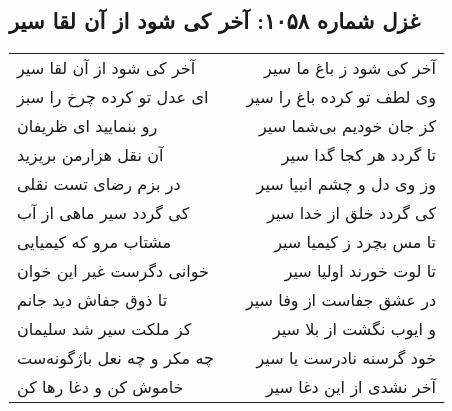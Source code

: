 \begin{center}
\section*{غزل شماره ۱۰۵۸: آخر کی شود از آن لقا سیر}
\label{sec:1058}
\begin{longtable}{l p{0.5cm} r}
آخر کی شود از آن لقا سیر
&&
آخر کی شود ز باغ ما سیر
\\
ای عدل تو کرده چرخ را سبز
&&
وی لطف تو کرده باغ را سیر
\\
رو بنمایید ای ظریفان
&&
کز جان خودیم بی‌شما سیر
\\
آن نقل هزارمن بریزید
&&
تا گردد هر کجا گدا سیر
\\
در بزم رضای تست نقلی
&&
وز وی دل و چشم انبیا سیر
\\
کی گردد سیر ماهی از آب
&&
کی گردد خلق از خدا سیر
\\
مشتاب مرو که کیمیایی
&&
تا مس بچرد ز کیمیا سیر
\\
خوانی دگرست غیر این خوان
&&
تا لوت خورند اولیا سیر
\\
تا ذوق جفاش دید جانم
&&
در عشق جفاست از وفا سیر
\\
کز ملکت سیر شد سلیمان
&&
و ایوب نگشت از بلا سیر
\\
چه مکر و چه نعل باژگونه‌ست
&&
خود گرسنه نادرست یا سیر
\\
خاموش کن و دغا رها کن
&&
آخر نشدی از این دغا سیر
\\
\end{longtable}
\end{center}
